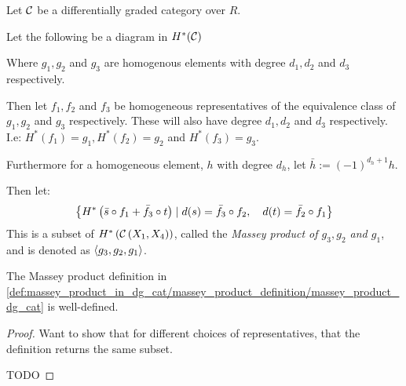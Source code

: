 \begin{definition}
    \label{def:massey_product_in_dg_cat/massey_product_definition/massey_product_dg_cat}
    Let \( {\mathcal{C}} \) be a differentially graded category over \( R \).

    Let the following be a diagram in \( H^*({\mathcal{C}}) \)
    \begin{center}
    \end{center}

    Where \( g_1, g_2 \) and \( g_3 \) are homogenous elements with degree \( d_1, d_2 \) and \( d_3 \) respectively.

    Then let \( f_1, f_2 \) and \( f_3 \) be homogeneous representatives of the equivalence class of \( g_1, g_2 \) and \( g_3 \) respectively. These will also have degree \( d_1, d_2 \) and \( d_3 \) respectively. I.e: \( H^*(f_1) = g_1, H^*(f_2) = g_2 \) and \( H^*(f_3) = g_3 \).

    Furthermore for a homogeneous element, \( h \) with degree \( d_h \), let \( \bar{h} := (-1)^{d_h + 1}h \).

    Then let:
    \[
        \left\{ 
            H^* \left( 
                \bar{s} \circ f_1 + \bar{f_3} \circ t
             \right)
            \mid
            d(s) = \bar{f_3} \circ f_2, \quad
            d(t) = \bar{f_2} \circ f_1
         \right\}
    \]
    This is a subset of \( H^* \left( {\mathcal{C}} \left( X_1, X_4 \right) \right) \), called the \emph{Massey product of \( g_3, g_2 \) and \( g_1 \)}, and is denoted as \( \langle g_3, g_2, g_1  \rangle \).
\end{definition}

\begin{theorem}
    The Massey product definition in \autoref{def:massey_product_in_dg_cat/massey_product_definition/massey_product_dg_cat} is well-defined.
\end{theorem}
\begin{proof}
    Want to show that for different choices of representatives, that the definition returns the same subset.

    TODO
\end{proof}

